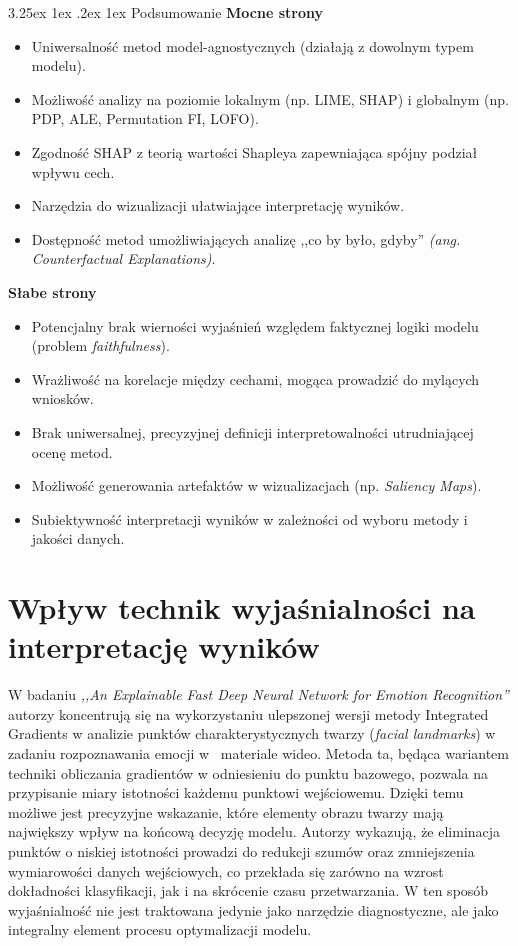 \documentclass[wmii, inf, mgr]{uwmthesis}
\makeatletter
\renewcommand\paragraph{\@startsection{paragraph}{4}{\z@}%
  {3.25ex \@plus1ex \@minus.2ex}%
  {1ex}%
  {\normalfont\normalsize\bfseries}}
\makeatother
\begin{document}
\paragraph{Podsumowanie}
\textbf{Mocne strony}
\begin{itemize}
    \item Uniwersalność metod model-agnostycznych (działają z dowolnym typem modelu).
    \item Możliwość analizy na poziomie lokalnym (np. LIME, SHAP) i globalnym (np. PDP, ALE, Permutation FI, LOFO).
    \item Zgodność SHAP z teorią wartości Shapleya zapewniająca spójny podział wpływu cech.
    \item Narzędzia do wizualizacji ułatwiające interpretację wyników.
    \item Dostępność metod umożliwiających analizę ,,co by było, gdyby'' \textit{(ang. Counterfactual Explanations)}.
\end{itemize}

\textbf{Słabe strony}
\begin{itemize}
    \item Potencjalny brak wierności wyjaśnień względem faktycznej logiki modelu (problem \textit{faithfulness}).
    \item Wrażliwość na korelacje między cechami, mogąca prowadzić do mylących wniosków.
    \item Brak uniwersalnej, precyzyjnej definicji interpretowalności utrudniającej ocenę metod.
    \item Możliwość generowania artefaktów w wizualizacjach (np. \textit{Saliency Maps}).
    \item Subiektywność interpretacji wyników w zależności od wyboru metody i jakości danych.
\end{itemize}

\section{Wpływ technik wyjaśnialności na interpretację wyników}
W badaniu \textit{,,An Explainable Fast Deep Neural Network for Emotion Recognition''} \cite{IntegratedGradients} autorzy koncentrują się na wykorzystaniu ulepszonej wersji metody Integrated Gradients w analizie punktów charakterystycznych twarzy (\textit{facial landmarks}) w zadaniu rozpoznawania emocji w~ materiale wideo. Metoda ta, będąca wariantem techniki obliczania gradientów w odniesieniu do punktu bazowego, pozwala na przypisanie miary istotności każdemu punktowi wejściowemu. Dzięki temu możliwe jest precyzyjne wskazanie, które elementy obrazu twarzy mają największy wpływ na końcową decyzję modelu. Autorzy wykazują, że eliminacja punktów o niskiej istotności prowadzi do redukcji szumów oraz zmniejszenia wymiarowości danych wejściowych, co przekłada się zarówno na wzrost dokładności klasyfikacji, jak i na skrócenie czasu przetwarzania. W ten sposób wyjaśnialność nie jest traktowana jedynie jako narzędzie diagnostyczne, ale jako integralny element procesu optymalizacji modelu.
\end{document}
